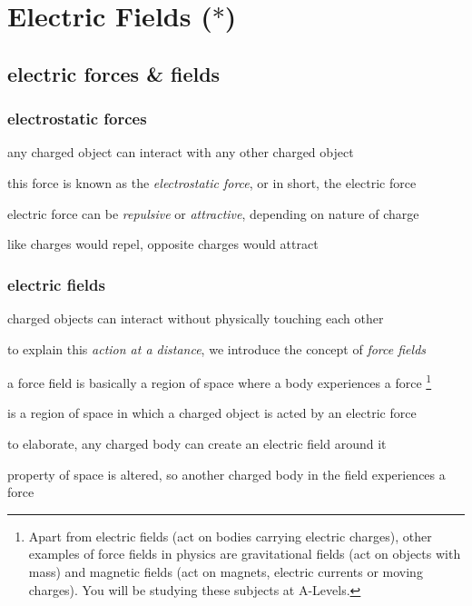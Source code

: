 \section{\texorpdfstring{Electric Fields ($\ast$)}{Electric Fields}}

\subsection{electric forces \& fields}

\subsubsection{electrostatic forces}

any charged object can interact with any other charged object

this force is known as the \emph{electrostatic force}, or in short, the electric force

\cmt electric force can be \emph{repulsive} or \emph{attractive}, depending on nature of charge

like charges would repel, opposite charges would attract



\subsubsection{electric fields}

charged objects can interact without physically touching each other 

to explain this \emph{action at a distance}, we introduce the concept of \emph{force fields}

a force field is basically a region of space where a body experiences a force
\footnote{Apart from electric fields (act on bodies carrying electric charges), other examples of force fields in physics are gravitational fields (act on objects with mass) and magnetic fields (act on magnets, electric currents or moving charges). You will be studying these subjects at A-Levels.}

\begin{ilight}
	\centering {} is a region of space in which a charged object is acted by an electric force
\end{ilight}

to elaborate, any charged body can create an electric field around it

property of space is altered, so another charged body in the field experiences a force

